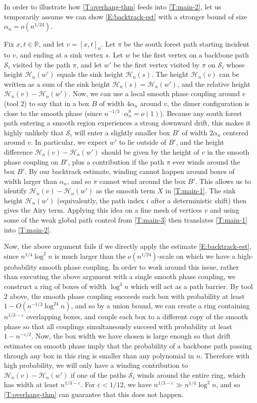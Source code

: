 \documentclass[11pt,twoside]{amsart}
\theoremstyle{plain}
\numberwithin{quest}{section}
\theoremstyle{remark}
\numberwithin{rem}{section}
\theoremstyle{definition}
\newcommand{\eps}{\varepsilon}
\newcommand{\R}{\mathbb{R}}
\newcommand{\cS}{\mathcal{S}}
\newcommand{\cH}{\mathcal{H}}
\begin{document}
In order to illustrate how \cref{T:overhang-thm} feeds into \cref{T:main-2}, let us temporarily assume we can show \eqref{E:backtrack-est} with a stronger bound of size $\alpha_n = o(n^{1/24})$. 

Fix $x, t \in \R$, and let $v = [x, t]_n$. Let $\pi$ be the south forest path starting incident to $v$, and ending at a sink vertex $s$. Let $w$ be the first vertex on a backbone path $\cS_i$ visited by the path $\pi$, and let $w'$ be the first vertex visited by $\pi$ on $\cS_i$ whose height $\cH_n(w')$ equals the sink height $\cH_n(s)$. The height $\cH_n(v)$ can be written as a sum of the sink height $\cH_n(s) = \cH_n(w')$, and the relative height $\cH_n(v) - \cH_n(w')$. Now, we can use a local smooth phase coupling around $v$ (tool $2$) to say that in a box $B$ of width $4 \alpha_n$ around $v$, the dimer configuration is close to the smooth phase (since $n^{-1/3} \cdot \alpha_n^8 = o(1)$). 
	Because any south forest path entering a smooth region experiences a strong downward drift, this makes it highly unlikely that $\cS_i$ will enter a slightly smaller box $B'$ of width $2 \alpha_n$ centered around $v$. In particular, we expect $w'$ to lie outside of $B'$, and the height difference $\cH_n(v) - \cH_n(w')$ should be given by the height of $v$ in the smooth phase coupling on $B'$, plus a contribution if the path $\pi$ ever winds around the box $B'$. By our backtrack estimate, winding cannot happen around boxes of width larger than $\alpha_n$, and so $\pi$ cannot wind around the box $B'$. This allows us to identify $\cH_n(v) - \cH_n(w')$ as the smooth term $X$ in \cref{T:main-1}. The sink height $\cH_n(w')$ (equivalently, the path index $i$ after a deterministic shift) then gives the Airy term. Applying this idea on a fine mesh of vertices $v$ and using some of the weak global path control from \cref{T:main-3} then translates \cref{T:main-1} into \cref{T:main-2}. 

    Now, the above argument fails if we directly apply the estimate \eqref{E:backtrack-est}, since $n^{1/4} \log^2 n$ is much larger than the $o(n^{1/24})$-scale on which we have a high-probability smooth phase coupling. In order to work around this issue, rather than executing the above argument with a single smooth phase coupling, we construct a ring of boxes of width $\log^3 n$ which will act as a path barrier. By tool $2$ above, the smooth phase coupling succeeds each box with probability at least $1 - O(n^{-1/3} \log^{24} n)$, and so by a union bound, we can create a ring containing $n^{1/3 - \eps}$ overlapping boxes, and couple each box to a different copy of the smooth phase so that all couplings simultaneously succeed with probability at least $1 - n^{-\eps/2}$. Now, the box width we have chosen is large enough so that drift estimates on smooth phase imply that the probability of a backbone path passing through any box in this ring is smaller than any polynomial in $n$. Therefore with high probability, we will only have a winding contribution to $\cH_n(v) - \cH_n(w')$ if one of the paths $\cS_i$ winds around the entire ring, which has width at least $n^{1/3 - \eps}$.  For $\eps < 1/12$,  we have $n^{1/3 - \eps} \gg n^{1/4} \log^2 n$, and so \cref{T:overhang-thm} can guarantee that this does not happen.
	
\end{document}

